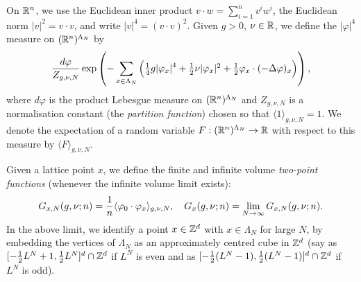 On ${\mathbb R}^n$, we use the Euclidean inner product $v \cdot w = \sum_{i=1}^n v^i w^i$,
the Euclidean norm $|v|^2 = v\cdot v$,
and write $|v|^4 = (v\cdot v)^2$.
Given $g>0$, $\nu \in {\mathbb R}$, we define
the $|\varphi|^4$ measure on $({\mathbb R}^n)^{\Lambda_N}$ by
\begin{equation}
\frac{d\varphi}{Z_{g,\nu,N}} \exp\left(-\sum_{x\in\Lambda_N}
  \Big(\tfrac{1}{4} g |\varphi_x|^4 + \textstyle{\frac 12} \nu |\varphi_x|^2
    + \textstyle{\frac 12} \varphi_x\cdot (-\Delta \varphi)_x 
  \Big)\right),
\end{equation}
where $d\varphi$ is the product Lebesgue measure on $({\mathbb R}^n)^{\Lambda_N}$
and $Z_{g,\nu,N}$ is a normalisation constant (the \emph{partition function})
chosen so that $\langle 1 \rangle_{g,\nu,N} = 1$. We denote the expectation
of a random variable $F:({\mathbb R}^n)^{\Lambda_N} \rightarrow {\mathbb R}$ with respect to this measure
by $\langle F \rangle_{g,\nu,N}$.

Given a lattice point $x$,
we define the finite and infinite volume \emph{two-point functions}
(whenever the infinite volume limit exists):
\begin{equation}\label{e:two-point-function-phi4}
G_{x, N}(g,\nu; n) =
\frac{1}{n} \langle \varphi_0 \cdot \varphi_x \rangle_{g,\nu, N},
\quad
G_x(g,\nu; n) = \lim_{N \rightarrow \infty} G_{x, N}(g,\nu; n).
\end{equation}
In the above limit, we identify a point $x \in { {{\mathbb Z}}^d }$ with $x \in \Lambda_N$
for large $N$, by embedding the vertices of $\Lambda_N$ as an approximately
centred cube in ${\mathbb Z}^d$ (say as $[-\frac12 L^N+1,\frac12 L^N]^d \cap {\mathbb Z}^d$ if $L^N$ is even
and as $[-\frac12 (L^N-1), \frac12 (L^N-1)]^d \cap {\mathbb Z}^d$ if $L^N$ is odd).

